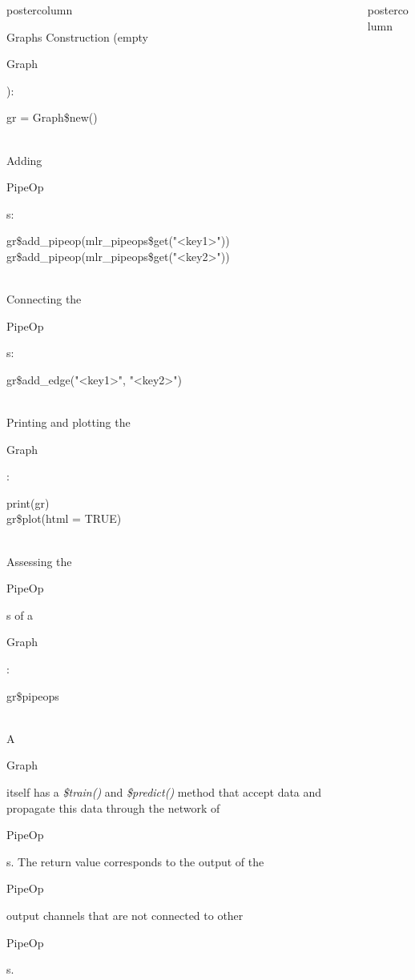 \documentclass{beamer}
\newlength{\columnheight} %
\newcommand{\codeinline}[1]{\begin{codeboxinline}#1\end{codeboxinline}}
\begin{document}
\begin{frame}[fragile]{}
\begin{columns}
\begin{column}{.245\textwidth}
\begin{beamercolorbox}[center]{postercolumn}
\begin{minipage}{.98\textwidth}
{\begin{myblock}{Graphs}
              Construction (empty \codeinline{Graph}):
              \begin{codebox}
                gr = Graph\$new()
              \end{codebox}
              \ \\
              Adding \codeinline{PipeOp}s:
              \begin{codeboxmultiline}[width=22cm]
                gr\$add\_pipeop(mlr\_pipeops\$get("<key1>"))\\
                gr\$add\_pipeop(mlr\_pipeops\$get("<key2>"))
              \end{codeboxmultiline}
              \ \\
              Connecting the \codeinline{PipeOp}s:
              \begin{codebox}
                gr\$add\_edge("<key1>", "<key2>")
              \end{codebox}
              \ \\
              Printing and plotting the \codeinline{Graph}:
              \begin{codeboxmultiline}[width=12cm]
                print(gr)\\
                gr\$plot(html = TRUE)
              \end{codeboxmultiline}
              \ \\
              Assessing the \codeinline{PipeOp}s of a \codeinline{Graph}:
              \begin{codebox}
                gr\$pipeops
              \end{codebox}
              \ \\
              A \codeinline{Graph} itself has a \textit{\$train()} and \textit{\$predict()} method that accept data and propagate this data through the network of \codeinline{PipeOp}s. The return value corresponds to the output of the \codeinline{PipeOp} output channels that are not connected to other \codeinline{PipeOp}s.\\
						\end{myblock}
						\vfill}
				\end{minipage}
			\end{beamercolorbox}
		\end{column}
		\begin{column}{.245\textwidth}
			\begin{beamercolorbox}[center]{postercolumn}
				\begin{minipage}{.98\textwidth}
					\parbox[t][\columnheight]{\textwidth}{
}
\end{minipage}
\end{beamercolorbox}
\end{column}
\end{columns}
\end{frame}
\end{document}

